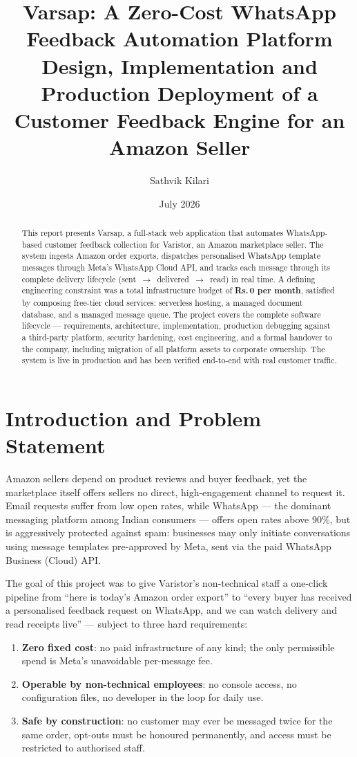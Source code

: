 \documentclass[11pt,a4paper]{article}
\title{Varsap: A Zero-Cost WhatsApp Feedback Automation Platform\\
\large Design, Implementation and Production Deployment of a Customer
Feedback Engine for an Amazon Seller}
\author{Sathvik Kilari}
\date{July 2026}
\newcommand{\rupee}{Rs.\,}
\begin{document}
\maketitle

\begin{abstract}
This report presents Varsap, a full-stack web application that automates
WhatsApp-based customer feedback collection for Varistor, an Amazon
marketplace seller. The system ingests Amazon order exports, dispatches
personalised WhatsApp template messages through Meta's WhatsApp Cloud API,
and tracks each message through its complete delivery lifecycle
(sent~$\rightarrow$~delivered~$\rightarrow$~read) in real time. A defining
engineering constraint was a total infrastructure budget of
\textbf{\rupee 0 per month}, satisfied by composing free-tier cloud
services: serverless hosting, a managed document database, and a managed
message queue. The project covers the complete software lifecycle ---
requirements, architecture, implementation, production debugging against a
third-party platform, security hardening, cost engineering, and a formal
handover to the company, including migration of all platform assets to
corporate ownership. The system is live in production and has been verified
end-to-end with real customer traffic.
\end{abstract}

\section{Introduction and Problem Statement}

Amazon sellers depend on product reviews and buyer feedback, yet the
marketplace itself offers sellers no direct, high-engagement channel to
request it. Email requests suffer from low open rates, while WhatsApp ---
the dominant messaging platform among Indian consumers --- offers open
rates above 90\%, but is aggressively protected against spam: businesses
may only initiate conversations using message templates pre-approved by
Meta, sent via the paid WhatsApp Business (Cloud) API.

The goal of this project was to give Varistor's non-technical staff a
one-click pipeline from ``here is today's Amazon order export'' to
``every buyer has received a personalised feedback request on WhatsApp,
and we can watch delivery and read receipts live'' --- subject to three
hard requirements:

\begin{enumerate}[nosep]
  \item \textbf{Zero fixed cost}: no paid infrastructure of any kind; the
        only permissible spend is Meta's unavoidable per-message fee.
  \item \textbf{Operable by non-technical employees}: no console access,
        no configuration files, no developer in the loop for daily use.
  \item \textbf{Safe by construction}: no customer may ever be messaged
        twice for the same order, opt-outs must be honoured permanently,
        and access must be restricted to authorised staff.
\end{enumerate}
\end{document}
